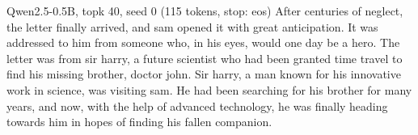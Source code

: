 \begin{modelout}{Qwen2.5-0.5B, topk 40, seed 0 (115 tokens, stop: eos)}
\small After centuries of neglect, the letter finally arrived, and sam opened it with great anticipation. It was addressed to him from someone who, in his eyes, would one day be a hero. The letter was from sir harry, a future scientist who had been granted time travel to find his missing brother, doctor john. Sir harry, a man known for his innovative work in science, was visiting sam. He had been searching for his brother for many years, and now, with the help of advanced technology, he was finally heading towards him in hopes of finding his fallen companion.
\end{modelout}
